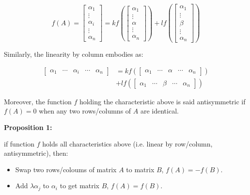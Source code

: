 \documentclass{article}
\begin{document}
\begin{equation}
f(A)=
\begin{bmatrix}
    \alpha_1 \\
    \vdots \\
    \alpha_i \\
    \vdots \\
    \alpha_n
\end{bmatrix} =
kf(
\begin{bmatrix}
    \alpha_1 \\
    \vdots \\
    \alpha \\
    \vdots \\
    \alpha_n
\end{bmatrix}) + lf(
\begin{bmatrix}
    \alpha_1 \\
    \vdots \\
    \beta \\
    \vdots \\
    \alpha_n
\end{bmatrix}
)
\end{equation}

Similarly, the linearity by column embodies as:

\begin{equation}
\begin{split}
\begin{bmatrix}
    \alpha_1 &
    \cdots &
    \alpha_i &
    \cdots &
    \alpha_n
\end{bmatrix} & =
kf(
\begin{bmatrix}
    \alpha_1 &
    \cdots &
    \alpha &
    \cdots &
    \alpha_n
\end{bmatrix}) \\
& + lf(
\begin{bmatrix}
    \alpha_1 &
    \cdots &
    \beta &
    \cdots &
    \alpha_n
\end{bmatrix}
)
\end{split}
\end{equation}

Moreover, the function \(f\) holding the characteristic above is
said antisymmetric if
\(f(A)=0\) when any two rows/columns of \(A\) are identical. 

\vspace{2mm}
\textbf{Proposition 1:}

if function \(f\) holds all characteristics above (i.e. linear
by row/column, antisymmetric), then:

\begin{itemize}
    \item Swap two rows/coloums of matrix \(A\) to matrix \(B\),
    \(f(A)=-f(B)\).
    \item Add \(\lambda\alpha_j\) to \(\alpha_i\) to get matrix \(B\),
    \(f(A)=f(B)\).
\end{itemize}
\end{document}
